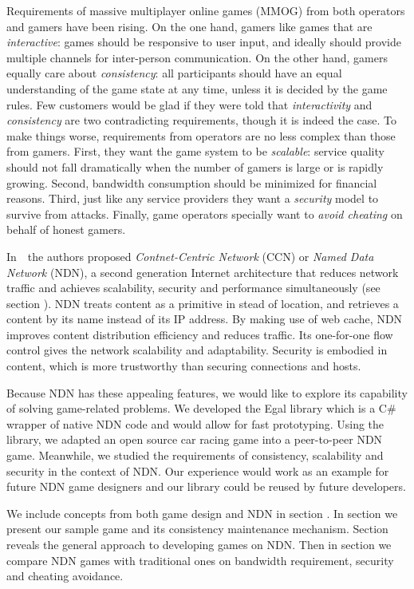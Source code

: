 \documentclass{sigchi}
\begin{document}
Requirements of massive multiplayer online games (MMOG) from both operators and gamers have been rising. On the one hand, gamers like games that are \emph{interactive}: games should be responsive to user input, and ideally should provide multiple channels for inter-person communication. On the other hand, gamers equally care about \emph{consistency}: all participants should have an equal understanding of the game state at any time, unless it is decided by the game rules. Few customers would be glad if they were told that \emph{interactivity} and \emph{consistency} are two contradicting requirements, though it is indeed the case. To make things worse, requirements from operators are no less complex than those from gamers. First, they want the game system to be \emph{scalable}: service quality should not fall dramatically when the number of gamers is large or is rapidly growing. Second, bandwidth consumption should be minimized for financial reasons. Third, just like any service providers they want a \emph{security} model to survive from attacks. Finally, game operators specially want to \emph{avoid cheating} on behalf of honest gamers.

In~\cite{Jndn}~the authors proposed \emph{Contnet-Centric Network} (CCN) or \emph{Named Data Network} (NDN), a second generation Internet architecture that reduces network traffic and achieves scalability, security and performance simultaneously (see section ). NDN treats content as a primitive in stead of location, and retrieves a content by its name instead of its IP address. By making use of web cache, NDN improves content distribution efficiency and reduces traffic. Its one-for-one flow control gives the network scalability and adaptability. Security is embodied in content, which is more trustworthy than securing connections and hosts.

Because NDN has these appealing features, we would like to explore its capability of solving game-related problems. We developed the Egal library which is a C\# wrapper of native NDN code and would allow for fast prototyping. Using the library, we adapted an open source car racing game into a peer-to-peer NDN game. Meanwhile, we studied the requirements of consistency, scalability and security in the context of NDN. Our experience would work as an example for future NDN game designers and our library could be reused by future developers.

We include concepts from both game design and NDN in section . In section  we present our sample game and its consistency maintenance mechanism. Section  reveals the general approach to developing games on NDN. Then in section  we compare NDN games with traditional ones on bandwidth requirement, security and cheating avoidance.
\end{document}
